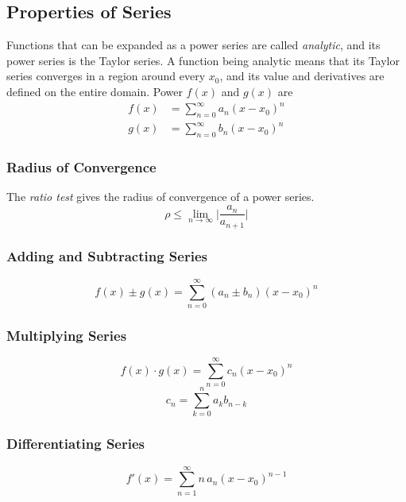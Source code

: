 \subsection{Properties of Series}
Functions that can be expanded as a power series are called \emph{analytic}, and its power series is the Taylor series. A function being analytic means that its Taylor series converges in a region around every $x_0$, and its value and derivatives are defined on the entire domain. Power $f(x)$ and $g(x)$ are
\begin{align*}
    f(x) & = \sum_{n=0}^\infty a_n (x-x_0)^n \\
    g(x) & = \sum_{n=0}^\infty b_n (x-x_0)^n
\end{align*}

\subsubsection{Radius of Convergence}
The \emph{ratio test} gives the radius of convergence of a power series.
\begin{equation*}
    \rho \leq \lim_{n\longrightarrow \infty} \Big|\frac{a_n}{a_{n+1}}\Big|
\end{equation*}

\subsubsection{Adding and Subtracting Series}
\begin{equation*}
    f(x) \pm g(x) = \sum_{n=0}^\infty (a_n\pm b_n) (x-x_0)^n
\end{equation*}

\subsubsection{Multiplying Series}
\begin{equation*}
    f(x) \cdot g(x) = \sum_{n=0}^\infty c_n (x-x_0)^n
\end{equation*}
\begin{equation*}
    c_n = \sum_{k=0}^n a_k b_{n-k}
\end{equation*}

\subsubsection{Differentiating Series}
\begin{equation*}
    f'(x) = \sum_{n=1}^\infty n\, a_n (x-x_0)^{n-1}
\end{equation*}

